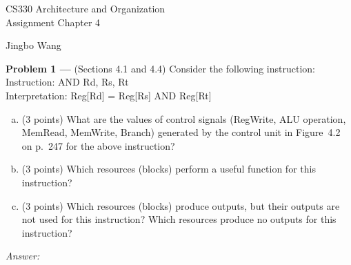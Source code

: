 \documentclass[11pt]{article}
\newcommand{\problem}[1]{\textbf{Problem #1 ---} }
\newcommand{\answer}{{\color{red}\textit{Answer: }}}
\begin{document}
\thispagestyle{empty}

\begin{center}
{\large CS330 Architecture and Organization}\\
Assignment Chapter 4
\end{center}

\begin{flushright}
Jingbo Wang
\end{flushright}



\problem{1}(Sections 4.1 and 4.4) Consider the following instruction:\\[6pt]
Instruction: \textsf{AND Rd, Rs, Rt}\\
Interpretation: \textsf{Reg[Rd] = Reg[Rs] AND Reg[Rt]}
\begin{enumerate}[(a)]
    \item(3 points) What are the values of control signals (\textsf{RegWrite, ALU operation, MemRead, MemWrite, Branch}) generated by the control unit in Figure~4.2 on p.~247 for the above instruction?
    \item (3 points) Which resources (blocks) perform a useful function for this instruction?
    \item (3 points) Which resources (blocks) produce outputs, but their outputs are not used for this instruction?  Which resources produce no outputs for this instruction?
\end{enumerate}

\answer
\end{document}
